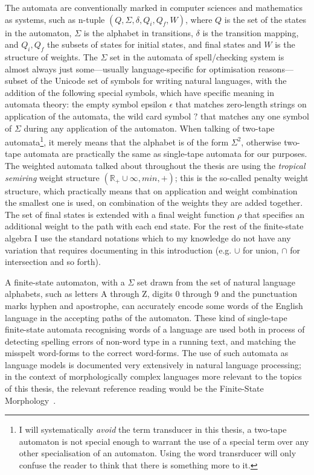 \documentclass[officiallayout]{unihelcompling}
\begin{document}
The automata are conventionally marked in computer sciences and mathematics as
systems, such as n-tuple $(Q, \Sigma, \delta, Q_i, Q_f, W)$, where $Q$ is the
set of the states in the automaton, $\Sigma$ is the alphabet in transitions,
$\delta$ is the transition mapping, and $Q_i, Q_f$ the subsets of states for
initial states, and final states and $W$ is the structure of weights. The
$\Sigma$ set in the automata of spell\-/checking system is almost always just
some---usually language-specific for optimisation reasons---subset of the
Unicode set of symbols for writing natural languages, with the addition of the
following special symbols, which have specific meaning in automata theory: the
empty symbol epsilon $\epsilon$ that matches zero-length strings on application
of the automata, the wild card symbol $?$ that matches any one symbol of
$\Sigma$ during any application of the automaton.  When talking of two-tape
automata\footnote{I will systematically \emph{avoid} the term transducer in
    this thesis, a two-tape automaton is not special enough to warrant the use
    of a special term over any other specialisation of an automaton. Using the
    word transrducer will only confuse the reader to think that there is
something more to it.}, it merely means that the alphabet is of the form
$\Sigma^2$, otherwise two-tape automata are practically the same as single-tape
automata for our purposes. The weighted automata talked about throughout the
thesis are using the \emph{tropical semiring} weight structure $(\mathbb{R}_+
\cup \infty, min, +)$; this is the so-called penalty weight structure, which
practically means that on application and weight combination the smallest one
is used, on combination of the weights they are added together. The set of
final states is extended with a final weight function $\rho$ that specifies
an additional weight to the path with each end state. For the rest of the
finite-state algebra I use the standard notations which to my knowledge do not
have any variation that requires documenting in this introduction (e.g.  $\cup$
for union, $\cap$ for intersection and so forth).

A finite-state automaton, with a $\Sigma$ set drawn from the set of natural
language alphabets, such as letters A through Z, digits 0 through 9 and the
punctuation marks hyphen and apostrophe, can accurately encode some words of
the English language in the accepting paths of the automaton. These kind of single-tape
finite-state automata recognising words of a language are used both in process
of detecting spelling errors of non-word type in a running text, and matching
the misspelt word-forms to the correct word-forms. The use of such automata as
language models is documented very extensively in natural language processing;
in the context of morphologically complex languages more relevant to the topics of
this thesis, the relevant reference reading would be the Finite-State Morphology~\citep{beesley2003finite,beesley2004morphological}.
\end{document}
